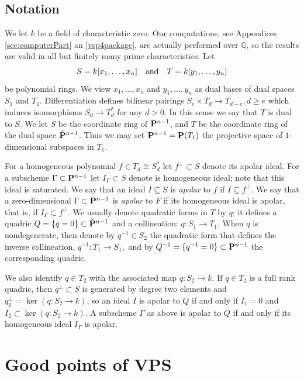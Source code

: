 \documentclass{amsart}
\newcommand{\QQ}{{\mathbb Q}}
\newcommand{\PP}{{\bf P}}
\newcommand{\kk}{k}
\begin{document}
\subsection{Notation}
We let $k$ be a field of characteristic zero.  Our computations, see Appendices \ref{sec:computerPart} an \ref{vsp4package}, are actually performed over $\QQ$, so the results are valid in all but finitely many prime characteristics. 
Let $$S = \kk[x_1, \ldots, x_n]\quad {\rm and} \quad T = \kk[y_1, \ldots ,y_n]$$ be polynomial
rings. We view $x_1, \ldots ,x_n$ and $y_1, \ldots ,y_n$ as dual bases of dual
spaces $S_1$ and $T_1$.  Differentiation defines bilinear pairings $S_e\times T_d\to T_{d-e}, d\geq e$ which induces isomorphisms $S_d\to T_d^*$ for any $d>0$.  In this sense we say that $T$ is dual to $S$.
We let $S$ be the coordinate ring of $\PP^{n-1}$, and $T$ be the coordinate ring of the dual space $\check{\PP}^{n-1}$.  Thus we may set $\PP^{n-1}=\PP(T_1)$ the projective space of $1$-dimensional subspaces in $T_1$.

For a homogeneous polynomial $f\in T_d\cong S_d^*$ let $f^{\perp} \subset S$ denote its apolar ideal.
For a subscheme $\Gamma \subset \PP^{n-1}$ let $I_{\Gamma}\subset S$ denote is homogeneous ideal; note that this ideal is saturated.
We say that an ideal $I\subseteq S$ is \emph{apolar} to $f$ if $I\subseteq
f^{\perp}$. We say that a zero-dimensional $\Gamma \subset \PP^{n-1}$ is
\emph{apolar} to $F$ if its homogeneous ideal is apolar, that is, if $I_{\Gamma} \subset f^{\perp}$. 
We usually denote quadratic forms in $T$ by $q$; it defines a quadric $Q = \{q=0\} \subset \check\PP^{n-1}$ and a collineation: $q:S_1\to T_1$. When $q$ is nondegenerate, then denote by $q^{-1}\in S_2$ the quadratic form that defines the inverse collineation,
$q^{-1}:T_1\to S_1,$ and by $Q^{-1}=\{q^{-1}=0\}\subset \PP^{n-1}$ the corresponding quadric.

We also identify $q\in T_2$ with the
associated map $q\colon S_2\to k$.
If $q\in T_2$ is a full rank quadric, then $q^\perp\subset S$ is generated by degree two
elements and $q^\perp_2 = \ker(q\colon S_2\to k)$, so an ideal $I$ is apolar to $Q$  if and only if $I_1=0$ and
$I_2\subset \ker(q\colon S_2\to k)$. A subscheme $\Gamma$ as above is apolar to $Q$ if and only if its homogeneous ideal $I_{\Gamma}$ is apolar.  

\section{Good points of VPS}\label{sec:apolarity}
\end{document}
